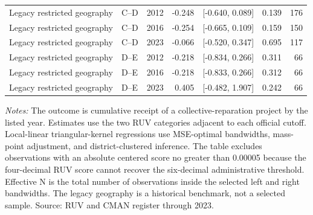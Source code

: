 \begin{table}[!htbp]
\begin{tabular}{llrrrrr}
Legacy restricted geography & C--D & 2012 & -0.248 & [-0.640, 0.089] & 0.139 & 176 \\
Legacy restricted geography & C--D & 2016 & -0.254 & [-0.665, 0.109] & 0.159 & 150 \\
Legacy restricted geography & C--D & 2023 & -0.066 & [-0.520, 0.347] & 0.695 & 117 \\
Legacy restricted geography & D--E & 2012 & -0.218 & [-0.834, 0.266] & 0.311 & 66 \\
Legacy restricted geography & D--E & 2016 & -0.218 & [-0.833, 0.266] & 0.312 & 66 \\
Legacy restricted geography & D--E & 2023 & 0.405 & [-0.482, 1.907] & 0.242 & 66 \\
\bottomrule
\end{tabular}
\parbox{0.98\linewidth}{\footnotesize \textit{Notes:} The outcome is cumulative receipt of a collective-reparation project by the listed year. Estimates use the two RUV categories adjacent to each official cutoff. Local-linear triangular-kernel regressions use MSE-optimal bandwidths, mass-point adjustment, and district-clustered inference. The table excludes observations with an absolute centered score no greater than 0.00005 because the four-decimal RUV score cannot recover the six-decimal administrative threshold. Effective N is the total number of observations inside the selected left and right bandwidths. The legacy geography is a historical benchmark, not a selected sample. Source: RUV and CMAN register through 2023.}
\end{table}

